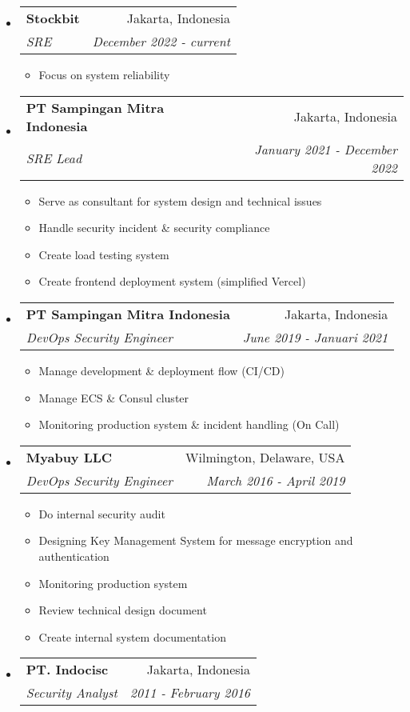 \documentclass[letterpaper,11pt]{article}
\makeatletter
\newcommand{\resitem}[1]{\item #1 \vspace{-2pt}}
\newcommand{\ressubheading}[4]{
\begin{tabular*}{6.5in}{l@{\cftdotfill{\cftsecdotsep}\extracolsep{\fill}}r}
		\textbf{#1} & #2 \\
		\textit{#3} & \textit{#4} \\
\end{tabular*}\vspace{-6pt}}
\makeatother
\begin{document}
\begin{itemize}

\item

    \ressubheading{Stockbit}{Jakarta, Indonesia}{SRE}{December 2022 - current}
	\begin{itemize}
		\resitem{Focus on system reliability}
	\end{itemize}

\item

    \ressubheading{PT Sampingan Mitra Indonesia}{Jakarta, Indonesia}{SRE Lead}{January 2021 - December 2022}
	\begin{itemize}
		\resitem{Serve as consultant for system design and technical issues}
		\resitem{Handle security incident & security compliance}
		\resitem{Create load testing system}
		\resitem{Create frontend deployment system (simplified Vercel)}
	\end{itemize}

\item

    \ressubheading{PT Sampingan Mitra Indonesia}{Jakarta, Indonesia}{DevOps Security Engineer}{June 2019 - Januari 2021}
	\begin{itemize}

  		\resitem{Manage development \& deployment flow (CI/CD)}
		\resitem{Manage ECS \& Consul cluster}
		\resitem{Monitoring production system \& incident handling (On Call)}

	\end{itemize}

\item

    \ressubheading{Myabuy LLC}{Wilmington, Delaware, USA}{DevOps Security Engineer}{March 2016 - April 2019}
	\begin{itemize}

  		\resitem{Do internal security audit}
		\resitem{Designing Key Management System for message encryption and authentication}
		\resitem{Monitoring production system}
		\resitem{Review technical design document}
		\resitem{Create internal system documentation}

	\end{itemize}

\item

	\ressubheading{PT. Indocisc}{Jakarta, Indonesia}{Security Analyst}{2011 - February 2016}

	\begin{itemize}


\end{itemize}
\end{itemize}
\end{document}
